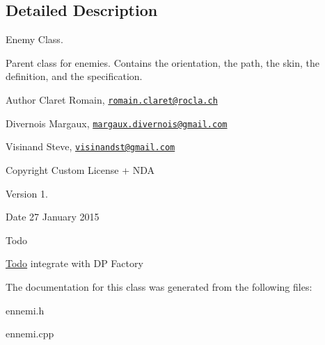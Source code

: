\subsection{Detailed Description}
Enemy Class. 

Parent class for enemies. Contains the orientation, the path, the skin, the definition, and the specification. \begin{DoxyAuthor}{Author}
Claret Romain, \href{mailto:romain.claret@rocla.ch}{\tt romain.\+claret@rocla.\+ch} 

Divernois Margaux, \href{mailto:margaux.divernois@gmail.com}{\tt margaux.\+divernois@gmail.\+com} 

Visinand Steve, \href{mailto:visinandst@gmail.com}{\tt visinandst@gmail.\+com} 
\end{DoxyAuthor}
\begin{DoxyCopyright}{Copyright}
Custom License + N\+D\+A 
\end{DoxyCopyright}
\begin{DoxyVersion}{Version}
1. 
\end{DoxyVersion}
\begin{DoxyDate}{Date}
27 January 2015 
\end{DoxyDate}
\begin{DoxyRefDesc}{Todo}
\item[\hyperlink{todo__todo000006}{Todo}]integrate with D\+P Factory \end{DoxyRefDesc}


The documentation for this class was generated from the following files\+:\begin{DoxyCompactItemize}
\item 
ennemi.\+h\item 
ennemi.\+cpp\end{DoxyCompactItemize}
